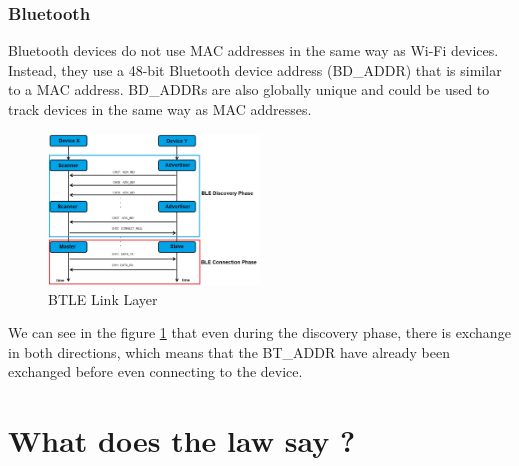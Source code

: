 \documentclass[aps,prb,twocolumn,superscriptaddress,floatfix,longbibliography,nofootinbib]{revtex4-2}
\begin{document}
    \subsubsection{\label{subsec:Bluetooth}Bluetooth}
    Bluetooth devices do not use MAC addresses in the same way as Wi-Fi devices.
    Instead, they use a 48-bit Bluetooth device address (BD\_ADDR) that is similar to a MAC address.
    BD\_ADDRs are also globally unique and could be used to track devices in the same way as MAC addresses.
    \begin{figure}[H]
        \centering
        \includegraphics[width=0.5\textwidth]{pictures/Link-Layer-Roles-Change_ver1.png}
        \caption{BTLE Link Layer \cite{BLE5}}
        \label{fig:BT}
    \end{figure}
    We can see in the figure \ref{fig:BT} that even during the discovery phase, there
    is exchange in both directions, which means that the BT\_ADDR have already been 
    exchanged before even connecting to the device.


\section{\label{sec:Law}What does the law say ?}
\end{document}
